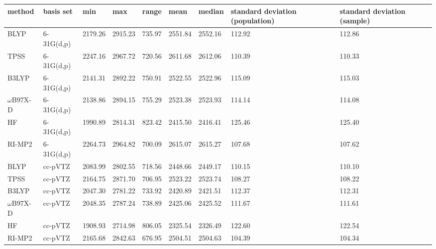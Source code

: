 \section{}
\label{paper_02:sec:SI}

\begin{table}[h]
  \centering
  \caption[Descriptive statistics for  asymmetric stretch frequencies from MD]{Statistics for dependence of  asymmetric stretch frequencies on quantum chemical method and basis set dependence on \num{1000} MD snapshots, 0 QM/256 MM. All frequencies in \si{\wavenumber}.}
  \label{paper_02:tab:S1}
  \begin{longtable}[]{@{}lllllllll@{}}
    \toprule
    \textbf{method} & \textbf{basis set} & \textbf{min} & \textbf{max} & \textbf{range} & \textbf{mean} & \textbf{median} & \textbf{standard deviation (population)} & \textbf{standard deviation (sample)}\tabularnewline
    \midrule
    \endhead
    BLYP & 6-31G(d,p) & 2179.26 & 2915.23 & 735.97 & 2551.84 & 2552.16 & 112.92 & 112.86\tabularnewline
    TPSS & 6-31G(d,p) & 2247.16 & 2967.72 & 720.56 & 2611.68 & 2612.06 & 110.39 & 110.33\tabularnewline
    B3LYP & 6-31G(d,p) & 2141.31 & 2892.22 & 750.91 & 2522.55 & 2522.96 & 115.09 & 115.03\tabularnewline
    \(\omega\)B97X-D & 6-31G(d,p) & 2138.86 & 2894.15 & 755.29 & 2523.38 & 2523.93 & 114.14 & 114.08\tabularnewline
    HF & 6-31G(d,p) & 1990.89 & 2814.31 & 823.42 & 2415.50 & 2416.41 & 125.46 & 125.40\tabularnewline
    RI-MP2 & 6-31G(d,p) & 2264.73 & 2964.82 & 700.09 & 2615.07 & 2615.27 & 107.68 & 107.62\tabularnewline
    BLYP & cc-pVTZ & 2083.99 & 2802.55 & 718.56 & 2448.66 & 2449.17 & 110.15 & 110.10\tabularnewline
    TPSS & cc-pVTZ & 2164.75 & 2871.70 & 706.95 & 2523.22 & 2523.74 & 108.27 & 108.22\tabularnewline
    B3LYP & cc-pVTZ & 2047.30 & 2781.22 & 733.92 & 2420.89 & 2421.51 & 112.37 & 112.31\tabularnewline
    \(\omega\)B97X-D & cc-pVTZ & 2048.35 & 2787.24 & 738.89 & 2425.06 & 2425.52 & 111.67 & 111.61\tabularnewline
    HF & cc-pVTZ & 1908.93 & 2714.98 & 806.05 & 2325.54 & 2326.49 & 122.60 & 122.54\tabularnewline
    RI-MP2 & cc-pVTZ & 2165.68 & 2842.63 & 676.95 & 2504.51 & 2504.63 & 104.39 & 104.34\tabularnewline
    \bottomrule
  \end{longtable}
\end{table}

\section{}
\label{paper_02:sec:SII}

